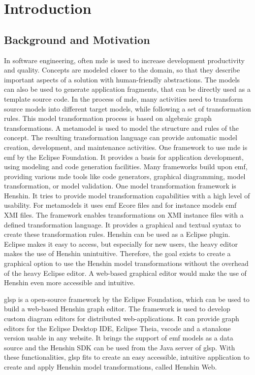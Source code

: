 \chapter{Introduction}
\label{sec:introduction}

\section{Background and Motivation}
\label{subsec:motivation}

In software engineering, often \ac{mde} is used to increase development productivity and quality. \cite{transformations-modeldriven} Concepts are modeled closer to the domain, so that they describe important aspects of a solution with human-friendly abstractions. The models can also be used to generate application fragments, that can be directly used as a template source code. In the process of \ac{mde}, many activities need to transform source models into different target models, while following a set of transformation rules. This model transformation process is based on algebraic graph transformations. A metamodel is used to model the structure and rules of the concept. The resulting transformation language can provide automatic model creation, development, and maintenance activities. \cite{transformations-modeldriven} One framework to use \ac{mde} is \ac{emf} by the Eclipse Foundation. It provides a basis for application development, using modeling and code generation facilities. Many frameworks build upon \ac{emf}, providing various \ac{mde} tools like code generators, graphical diagramming, model transformation, or model validation. \cite{emf} One model transformation framework is Henshin. \cite{henshin-repo} It tries to provide model transformation capabilities with a high level of usability. \cite{henshin-usability} For metamodels it uses \ac{emf} Ecore files and for instance models \ac{emf} XMI files. The framework enables transformations on XMI instance files with a defined transformation language. It provides a graphical and textual syntax to create these transformation rules. \cite{henshin-repo} Henshin can be used as a Eclipse plugin. Eclipse makes it easy to access, but especially for new users, the heavy editor makes the use of Henshin unintuitive.
Therefore, the goal exists to create a graphical option to use the Henshin model transformations without the overhead of the heavy Eclipse editor. A web-based graphical editor would make the use of Henshin even more accessible and intuitive.

\ac{glsp} is a open-source framework by the Eclipse Foundation, which can be used to build a web-based Henshin graph editor. The framework is used to develop custom diagram editors for distributed web-applications. \cite{glsp-repo} It can provide graph editors for the Eclipse Desktop IDE, Eclipse Theia, \ac{vscode} and a stanalone version usable in any website. It brings the support of \ac{emf} models as a data source and the Henshin SDK can be used from the Java server of \ac{glsp}. \cite{glsp-doc} With these functionalities, \ac{glsp} fits to create an easy accessible, intuitive application to create and apply Henshin model transformations, called Henshin Web.


